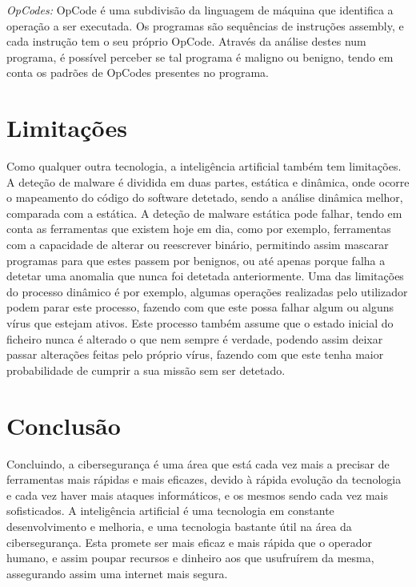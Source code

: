 \documentclass[11pt]{article}
\begin{document}
\textit{OpCodes:}
OpCode é uma subdivisão da linguagem de máquina que identifica a operação a ser executada. Os programas são sequências de instruções assembly, e cada instrução tem o seu próprio OpCode. Através da análise destes num programa, é possível perceber se tal programa é maligno ou benigno, tendo em conta os padrões de OpCodes presentes no programa.

\cite{18}\cite{19}

\section*{Limitações}
Como qualquer outra tecnologia, a inteligência artificial também tem limitações. A deteção de malware é dividida em duas partes, estática e dinâmica, onde ocorre o mapeamento do código do software detetado, sendo a análise dinâmica melhor, comparada com a estática. A deteção de malware estática pode falhar, tendo em conta as ferramentas que existem hoje em dia, como por exemplo, ferramentas com a capacidade de alterar ou reescrever binário, permitindo assim mascarar programas para que estes passem por benignos, ou até apenas porque falha a detetar uma anomalia que nunca foi detetada anteriormente. Uma das limitações do processo dinâmico é por exemplo, algumas operações realizadas pelo utilizador podem parar este processo, fazendo com que este possa falhar algum ou alguns vírus que estejam ativos. Este processo também assume que o estado inicial do ficheiro nunca é alterado o que nem sempre é verdade, podendo assim deixar passar alterações feitas pelo próprio vírus, fazendo com que este tenha maior probabilidade de cumprir a sua missão sem ser detetado.\cite{1}\cite{20}


\section*{Conclusão}

Concluindo, a cibersegurança é uma área que está cada vez mais a precisar de ferramentas mais rápidas e mais eficazes, devido à rápida evolução da tecnologia e cada vez haver mais ataques informáticos, e os mesmos sendo cada vez mais sofisticados. A inteligência artificial é uma tecnologia em constante desenvolvimento e melhoria, e uma tecnologia bastante útil na área da cibersegurança. Esta promete ser mais eficaz e mais rápida que o operador humano, e assim poupar recursos e dinheiro aos que usufruírem da mesma, assegurando assim uma internet mais segura.

\newpage



\end{document}
